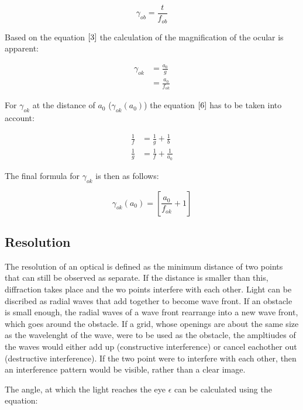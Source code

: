 \label{5}
\begin{equation}
  \gamma_{ob} = \frac{t}{f_{ob}} \tag{5}
  \end{equation}

Based on the equation $\ref{3}$ the calculation of the magnification of the ocular is apparent:

\label{3.1}
\begin{align*}
  \gamma_{ok} &= \frac{a_{0}}{g} \\
  &= \frac{a_0}{f_{ok}} \tag{3.1}
\end{align*}

For $\gamma_{ok}$ at the distance of $a_{0}$ ($\gamma_{ok}(a_{0})$) the equation $\ref{6}$ has to be taken into account:

\label{6}
\begin{align*}
  \frac{1}{f} &= \frac{1}{g} + \frac{1}{b} \tag{6} \\
  \frac{1}{g} &= \frac{1}{f} + \frac{1}{a_{0}} 
\end{align*}

The final formula for $\gamma_{ok}$ is then as follows:

\label{3.2}
\begin{equation}
  \gamma_{ok}(a_{0}) = [\frac{a_0}{f_{ok}} + 1]\tag{3.2}
  \end{equation}

\subsection{Resolution}

The resolution of an optical is defined as the minimum distance of two points that can still be observed as separate.
If the distance is smaller than this, diffraction takes place and the wo points interfere with each other. Light can be 
discribed as radial waves that add together to become wave front. If an obstacle is small enough, the radial waves of 
a wave front rearrange into a new wave front, which goes around the obstacle. If a grid, whose openings are about the same
size as the wavelenght of the wave, were to be used as the obstacle, the ampltiudes of the waves would either add up 
(constructive interference) or cancel eachother out (destructive interference). If the two point were to interfere with each 
other, then an interference pattern would be visible, rather than a clear image.

The angle, at which the light reaches the eye $\epsilon$ can be calculated using the equation:

